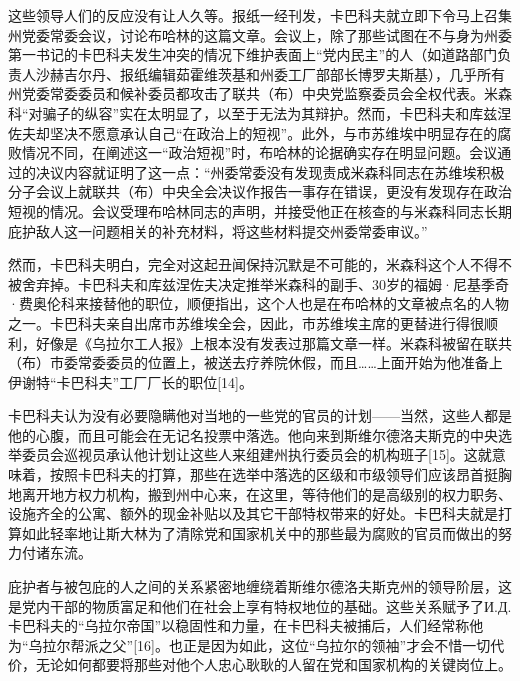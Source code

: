 这些领导人们的反应没有让人久等。报纸一经刊发，卡巴科夫就立即下令马上召集州党委常委会议，讨论布哈林的这篇文章。会议上，除了那些试图在不与身为州委第一书记的卡巴科夫发生冲突的情况下维护表面上“党内民主”的人（如道路部门负责人沙赫吉尔丹、报纸编辑茹霍维茨基和州委工厂部部长博罗夫斯基），几乎所有州党委常委委员和候补委员都攻击了联共（布）中央党监察委员会全权代表。米森科“对骗子的纵容”实在太明显了，以至于无法为其辩护。然而，卡巴科夫和库兹涅佐夫却坚决不愿意承认自己“在政治上的短视”。此外，与市苏维埃中明显存在的腐败情况不同，在阐述这一“政治短视”时，布哈林的论据确实存在明显问题。会议通过的决议内容就证明了这一点：“州委常委没有发现责成米森科同志在苏维埃积极分子会议上就联共（布）中央全会决议作报告一事存在错误，更没有发现存在政治短视的情况。会议受理布哈林同志的声明，并接受他正在核查的与米森科同志长期庇护敌人这一问题相关的补充材料，将这些材料提交州委常委审议。”

然而，卡巴科夫明白，完全对这起丑闻保持沉默是不可能的，米森科这个人不得不被舍弃掉。卡巴科夫和库兹涅佐夫决定推举米森科的副手、30岁的福姆·尼基季奇·费奥伦科来接替他的职位，顺便指出，这个人也是在布哈林的文章被点名的人物之一。卡巴科夫亲自出席市苏维埃全会，因此，市苏维埃主席的更替进行得很顺利，好像是《乌拉尔工人报》上根本没有发表过那篇文章一样。米森科被留在联共（布）市委常委委员的位置上，被送去疗养院休假，而且……上面开始为他准备上伊谢特“卡巴科夫”工厂厂长的职位[14]。

卡巴科夫认为没有必要隐瞒他对当地的一些党的官员的计划——当然，这些人都是他的心腹，而且可能会在无记名投票中落选。他向来到斯维尔德洛夫斯克的中央选举委员会巡视员承认他计划让这些人来组建州执行委员会的机构班子[15]。这就意味着，按照卡巴科夫的打算，那些在选举中落选的区级和市级领导们应该昂首挺胸地离开地方权力机构，搬到州中心来，在这里，等待他们的是高级别的权力职务、设施齐全的公寓、额外的现金补贴以及其它干部特权带来的好处。卡巴科夫就是打算如此轻率地让斯大林为了清除党和国家机关中的那些最为腐败的官员而做出的努力付诸东流。

庇护者与被包庇的人之间的关系紧密地缠绕着斯维尔德洛夫斯克州的领导阶层，这是党内干部的物质富足和他们在社会上享有特权地位的基础。这些关系赋予了И.Д.卡巴科夫的“乌拉尔帝国”以稳固性和力量，在卡巴科夫被捕后，人们经常称他为“乌拉尔帮派之父”[16]。也正是因为如此，这位“乌拉尔的领袖”才会不惜一切代价，无论如何都要将那些对他个人忠心耿耿的人留在党和国家机构的关键岗位上。

